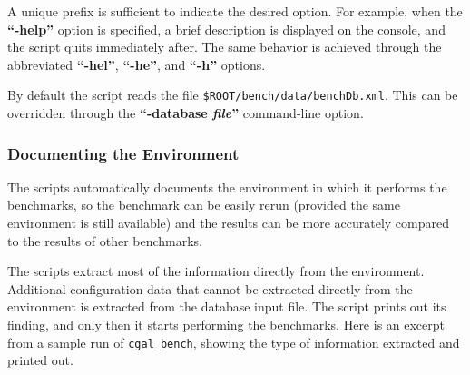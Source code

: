   
A unique prefix is sufficient to indicate the desired
option. For example, when the \textbf{``-help''} option is specified, 
a brief description is displayed on the console, and the script quits
immediately after. The same behavior is achieved through the
abbreviated \textbf{``-hel''}, \textbf{``-he''}, and \textbf{``-h''}
options.

By default the script reads the file
{\tt \$ROOT/bench/data/benchDb.xml}. This can be overridden through
the \textbf{``-database {\em file}''} command-line option.

\subsubsection{Documenting the Environment}
The scripts automatically documents the environment in which it
performs the benchmarks, so the benchmark can be easily rerun
(provided the same environment is still available) and the 
results can be more accurately compared to the results of other
benchmarks.

The scripts extract most of the information directly from the
environment. Additional configuration data that cannot be extracted
directly from the environment is extracted from the  database input
file. The script prints out its finding, and only then it starts
performing the benchmarks. Here is an excerpt from a sample run of
{\tt cgal\_bench}, showing the type of information extracted and
printed out.


